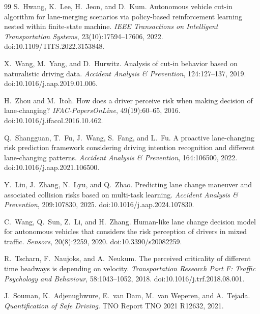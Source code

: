 \documentclass[12pt,a4paper,twoside,openright]{report}
\begin{document}
\begin{thebibliography}{99}
        S.~Hwang, K.~Lee, H.~Jeon, and D.~Kum.
        \newblock Autonomous vehicle cut-in algorithm for lane-merging scenarios via policy-based reinforcement learning nested within finite-state machine.
        \newblock \emph{IEEE Transactions on Intelligent Transportation Systems}, 23(10):17594--17606, 2022.
        \newblock doi:10.1109/TITS.2022.3153848.


        X.~Wang, M.~Yang, and D.~Hurwitz.
        \newblock Analysis of cut-in behavior based on naturalistic driving data.
        \newblock \emph{Accident Analysis \& Prevention}, 124:127--137, 2019.
        \newblock doi:10.1016/j.aap.2019.01.006.

        H.~Zhou and M.~Itoh.
        \newblock How does a driver perceive risk when making decision of lane-changing?
        \newblock \emph{IFAC-PapersOnLine}, 49(19):60--65, 2016.
        \newblock doi:10.1016/j.ifacol.2016.10.462.

        Q.~Shangguan, T.~Fu, J.~Wang, S.~Fang, and L.~Fu.
        \newblock A proactive lane-changing risk prediction framework considering driving intention recognition and different lane-changing patterns.
        \newblock \emph{Accident Analysis \& Prevention}, 164:106500, 2022.
        \newblock doi:10.1016/j.aap.2021.106500.

        Y.~Liu, J.~Zhang, N.~Lyu, and Q.~Zhao.
        \newblock Predicting lane change maneuver and associated collision risks based on multi-task learning.
        \newblock \emph{Accident Analysis \& Prevention}, 209:107830, 2025.
        \newblock doi:10.1016/j.aap.2024.107830.

        C.~Wang, Q.~Sun, Z.~Li, and H.~Zhang.
        \newblock Human-like lane change decision model for autonomous vehicles that considers the risk perception of drivers in mixed traffic.
        \newblock \emph{Sensors}, 20(8):2259, 2020.
        \newblock doi:10.3390/s20082259.

        R.~Tscharn, F.~Naujoks, and A.~Neukum.
        \newblock The perceived criticality of different time headways is depending on velocity.
        \newblock \emph{Transportation Research Part F: Traffic Psychology and Behaviour}, 58:1043--1052, 2018.
        \newblock doi:10.1016/j.trf.2018.08.001.

        J.~Souman, K.~Adjenughwure, E.~van Dam, M.~van Weperen, and A.~Tejada.
        \newblock \emph{Quantification of Safe Driving}.
        \newblock TNO Report TNO 2021 R12632, 2021.


\end{thebibliography}
\end{document}
